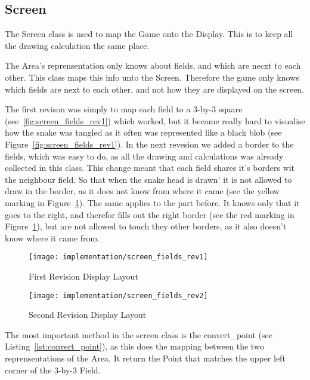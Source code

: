 \subsection{Screen}

The Screen class is used to map the Game onto the Display. This is to keep all the drawing calculation the same place.

The Area's reprensentation only knows about fields, and which are necxt to each other. This class maps this info unto the Screen. Therefore the game only knows which fields are next to each other, and not how they are displayed on the screen.

The first revison was simply to map each field to a 3-by-3 square (see~\ref{fig:screen_fields_rev1}) which worked, but it became really hard to visualise how the snake was tangled as it often was represented like a black blob (see Figure~\ref{fig:screen_fields_rev1}). In the next revesion we added a border to the fields, which was easy to do, as all the drawing and calculations was already collected in this class. This change meant that each field shares it's borders wit the neighbour field. So that when the snake head is drawn' it is not allowed to draw in the border, as it does not know from where it came (see the yellow marking in Figure~\ref{fig:screen_fields_rev2}). The same applies to the part before. It knows only that it goes to the right, and therefor fills out the right border (see the red marking in Figure~\ref{fig:screen_fields_rev2}), but are not allowed to touch they other borders, as it also doesn't know where it came from.

\begin{figure}
\centering
\begin{minipage}{.5\textwidth}
  \centering
	\texttt{[image: implementation/screen\_fields\_rev1]}
	\caption{First Revision Display Layout}
	\label{fig:screen_fields_rev1}
\end{minipage}%
\begin{minipage}{.5\textwidth}
  \centering
	\texttt{[image: implementation/screen\_fields\_rev2]}
	\caption{Second Revision Display Layout}
	\label{fig:screen_fields_rev2}
\end{minipage}
\end{figure}

The most important method in the screen class is the convert\_point (see Listing~\ref{lst:convert_point}), as this does the mapping between the two reprensentations of the Area. It return the Point that matches the upper left corner of the 3-by-3 Field.

